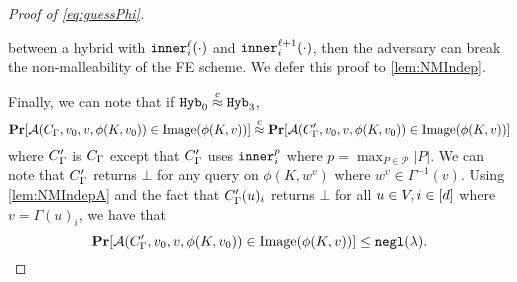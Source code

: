 \begin{proof}[Proof of \cref{eq:guessPhi}]
\begin{itemize}
\begin{itemize}
			between a hybrid with $\texttt{inner}_i^\ell(\cdot)$ and $\texttt{inner}_i^{\ell + 1}(\cdot)$, then the adversary can break
			the non-malleability of the FE scheme.
			We defer this proof to \cref{lem:NMIndep}.
		\end{itemize}
	\end{itemize}
	Finally, we can note that if $\texttt{Hyb}_0 \overset{c}{\approx} \texttt{Hyb}_3$,
	\begin{equation*}
		\operatorname*{\mathbf{Pr}}[\mathcal{A}(C_\Gamma, v_0, v, \phi(K, v_0)) \in \text{Image}(\phi(K, v))] 
		\overset{c}{\approx}
		\operatorname*{\mathbf{Pr}}[\mathcal{A}(C_\Gamma', v_0, v, \phi(K, v_0)) \in \text{Image}(\phi(K, v))] 
	\end{equation*}
	where $C_\Gamma'$ is $C_\Gamma$ except that $C_\Gamma'$ uses $\texttt{inner}_i^p$ where $p = \max_{P \in \mathcal{P}} |P|$.
	We can note that $C_\Gamma'$ returns $\bot$ for any query on $\phi(K, w^v)$ where $w^v \in \Gamma^{-1}(v)$.
	Using \cref{lem:NMIndepA} and the fact that $C_\Gamma'(u)_i$ returns $\bot$ for all $u \in V, i \in [d]$ where $v = \Gamma(u)_i$, we have that
	$$
		\operatorname*{\mathbf{Pr}}[\mathcal{A}(C_\Gamma', v_0, v, \phi(K, v_0)) \in \text{Image}(\phi(K, v))] \leq \texttt{negl}(\lambda).
	$$
	
\end{proof}

